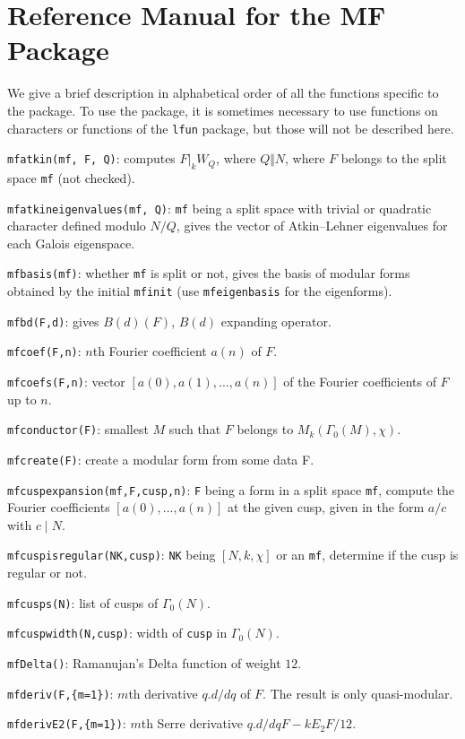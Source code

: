\documentclass[11pt]{article}
\newcommand{\G}{\Gamma}
\def\kbd#1{{\tt #1}}
\begin{document}
\section{Reference Manual for the MF Package}

We give a brief description in alphabetical order of all the functions
specific to the package. To use the package, it is sometimes necessary to
use functions on characters or functions of the \kbd{lfun} package, but
those will not be described here.

\smallskip

\kbd{mfatkin(mf, F, Q)}: computes $F|_k W_Q$, where $Q\Vert N$, where $F$
belongs to the split space \kbd{mf} (not checked).

\kbd{mfatkineigenvalues(mf, Q)}: \kbd{mf} being a split space with trivial
or quadratic character defined modulo $N/Q$, gives the vector of Atkin--Lehner
eigenvalues for each Galois eigenspace.

\kbd{mfbasis(mf)}: whether \kbd{mf} is split or not, gives the basis of
modular forms obtained by the initial \kbd{mfinit} (use \kbd{mfeigenbasis}
for the eigenforms).

\kbd{mfbd(F,d)}: gives $B(d)(F)$, $B(d)$ expanding operator.

\kbd{mfcoef(F,n)}: $n$th Fourier coefficient $a(n)$ of $F$.

\kbd{mfcoefs(F,n)}: vector $[a(0),a(1),...,a(n)]$ of the Fourier coefficients
of $F$ up to $n$.

\kbd{mfconductor(F)}: smallest $M$ such that $F$ belongs to
$M_k(\G_0(M),\chi)$.

\kbd{mfcreate(F)}: create a modular form from some data F.

\kbd{mfcuspexpansion(mf,F,cusp,n)}: \kbd{F} being a form in a split space
\kbd{mf}, compute the Fourier coefficients $[a(0),...,a(n)]$ at the given cusp,
given in the form $a/c$ with $c\mid N$.

\kbd{mfcuspisregular(NK,cusp)}: \kbd{NK} being $[N,k,\chi]$ or an \kbd{mf},
determine if the cusp is regular or not.

\kbd{mfcusps(N)}: list of cusps of $\G_0(N)$.

\kbd{mfcuspwidth(N,cusp)}: width of \kbd{cusp} in $\G_0(N)$.

\kbd{mfDelta()}: Ramanujan's Delta function of weight $12$.

\kbd{mfderiv(F,\{m=1\})}: $m$th derivative $q.d/dq$ of $F$. The result is
only quasi-modular.

\kbd{mfderivE2(F,\{m=1\})}: $m$th Serre derivative $q.d/dq F-kE_2F/12$.
\end{document}

